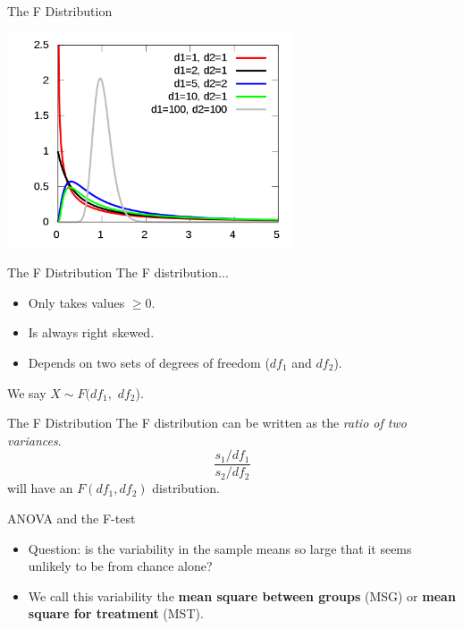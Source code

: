 \begin{frame}{The F Distribution}
    \begin{center}
        \includegraphics[height=2.5in]{images/fdist.png}
    \end{center}
\end{frame}

\begin{frame}{The F Distribution}
    The F distribution...
    \begin{itemize}
        \item Only takes values $\ge 0$.
        \item Is always right skewed.
        \item Depends on two sets of degrees of freedom ($df_1$ and $df_2$). 
    \end{itemize}
    
    \vspace{12pt}
    We say $X \sim F(df_1,$ $df_2$).
\end{frame}

\begin{frame}{The F Distribution}
    The F distribution can be written as the \textit{ratio of two variances}.
    \[
        \frac{s_1/df_1}{s_2/df_2}
    \]
    will have an $F(df_1, df_2)$ distribution. 
\end{frame}

\begin{frame}{ANOVA and the F-test}
    \begin{itemize}
        \item Question: is the variability in the sample means so large that it seems unlikely to be from chance alone?
        \item We call this variability the \textbf{mean square between groups} (MSG) or \textbf{mean square for treatment} (MST).
    \end{itemize}
\end{frame}

